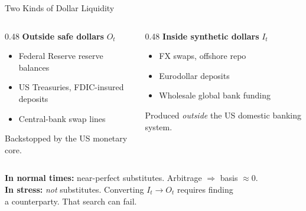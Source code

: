 \documentclass[aspectratio=169, 10pt]{beamer}
\begin{document}
\begin{frame}{Two Kinds of Dollar Liquidity}

  \begin{columns}
    \begin{column}{0.48\textwidth}
      \textbf{Outside safe dollars} $O_t$
      \begin{itemize}
        \item Federal Reserve reserve balances
        \item US Treasuries, FDIC-insured deposits
        \item Central-bank swap lines
      \end{itemize}
      \medskip
      {\color{dimgray} Backstopped by the US monetary core.}
    \end{column}
    \begin{column}{0.48\textwidth}
      \textbf{Inside synthetic dollars} $I_t$
      \begin{itemize}
        \item FX swaps, offshore repo
        \item Eurodollar deposits
        \item Wholesale global bank funding
      \end{itemize}
      \medskip
      {\color{dimgray} Produced \emph{outside} the US domestic banking system.}
    \end{column}
  \end{columns}

  \bigskip\bigskip

  \begin{center}
    \textbf{In normal times:} near-perfect substitutes. Arbitrage $\Rightarrow$ basis $\approx 0$.\\[0.5em]
    \textbf{In stress:} \emph{not} substitutes. Converting $I_t \to O_t$ requires finding\\
    a counterparty. That search can fail.
  \end{center}

\end{frame}
\end{document}
